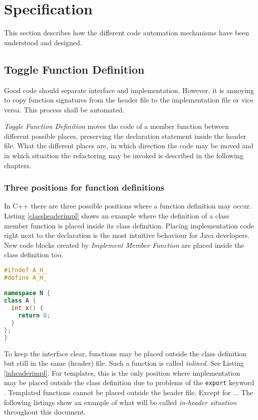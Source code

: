\chapter{Specification}
\thispagestyle{fancy}

This section describes how the different code automation mechanisms have been
understood and designed.

\section{Toggle Function Definition}

Good code should separate interface and implementation. However, it is 
annoying to copy function signatures from the header file to the implementation 
file or vice versa. This process shall be automated.

\textit{Toggle Function Definition} moves the code of a member function between 
different possible places, preserving the declaration statement inside the 
header file. What the different places are, in which direction the code may be 
moved and in which situation the refactoring may be invoked is described in the 
following chapters. 


\subsection{Three positions for function definitions}

\label{positions}
In C++ there are three possible positions where a
function definition may occur. Listing \ref{classheaderimpl} shows an example
where the definition of a class member function is placed inside its class
definition. Placing implementation code right next to the declaration is the
most intuitive behaviour for Java developers. New code blocks created by
\textit{Implement Member Function} are placed inside the class definition too.

\begin{lstlisting}[caption={In-class implementation in A.h},
label={classheaderimpl}, language=C++ ]
#ifndef A_H_
#define A_H_

namespace N {
class A {
  int x() {
    return 0;
  }
};
}
\end{lstlisting}

To keep the interface clear, functions may be 
placed outside the class definition but still in the same (header) file. Such a 
function is called \textit{inlined}. See Listing \ref{inheaderimpl}. For
templates, this is the only position where implementation may be placed outside
the class definition due to problems of the \texttt{export} keyword
\cite{ext03}. Templated
functions cannot be placed outside the header file. Except for ... 
The following listings show an example of what will be called 
\textit{in-header situation} throughout this document.

